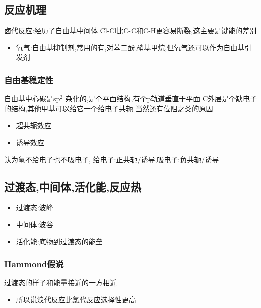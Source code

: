 \documentclass[11pt]{article}
\begin{document}
\subsection{反应机理}
\label{sec:orgebcb299}
卤代反应:经历了自由基中间体
Cl-Cl比C-C和C-H更容易断裂,这主要是键能的差别
\begin{itemize}
\item 氧气:自由基抑制剂,常用的有,对苯二酚,硝基甲烷,但氧气还可以作为自由基引发剂
\end{itemize}
\subsubsection{自由基稳定性}
\label{sec:org6e5454d}
自由基中心碳是sp\(^{\text{2}}\) 杂化的,是个平面结构,有个p轨道垂直于平面
C外层是个缺电子的结构,其他甲基可以给它一个给电子共轭
当然还有位阻之类的原因
\begin{itemize}
\item 超共轭效应
\item 诱导效应
\end{itemize}
认为氢不给电子也不吸电子,
给电子:正共轭/诱导,吸电子:负共轭/诱导
\subsection{过渡态,中间体,活化能,反应热}
\label{sec:orgbeb3373}
\begin{itemize}
\item 过渡态:波峰
\item 中间体:波谷
\item 活化能:底物到过渡态的能垒
\end{itemize}
\subsubsection{Hammond假说}
\label{sec:org7eefd32}
过渡态的样子和能量接近的一方相近
\begin{itemize}
\item 所以说溴代反应比氯代反应选择性更高
\end{itemize}
\end{document}
